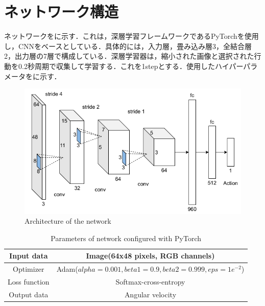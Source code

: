 
\section{ネットワーク構造}

  ネットワークをに示す．これは，深層学習フレームワークであるPyTorch\cite{pytorch}を使用し，CNNをベースとしている．具体的には，入力層，畳み込み層3，全結合層2，出力層の7層で構成している．深層学習器は，縮小された画像と選択された行動を0.2秒周期で収集して学習する．これを1stepとする．使用したハイパーパラメータをに示す．

  \begin{figure}[h]
    \centering
    \includegraphics[keepaspectratio, scale=0.60] {images/RobotGuidance_network.png}
    \caption{Architecture of the network}
    \label{Fig:RobotGuidance_network}
  \end{figure}

  \begin{table}[hbtp]
    \caption{Parameters of network configured with PyTorch}
    \label{tab:Parameters of network configured with pytorch}
    \centering
    \begin{tabular}{|c|c|}
      \hline
      Input data & Image(64x48 pixels, RGB channels) \\
      \hline
      Optimizer & Adam($alpha = 0.001, beta1 = 0.9, beta2 =  0.999, eps = 1e^{-2}$)\\
      \hline
      Loss function & Softmax-cross-entropy\\
      \hline
      Output data & Angular velocity\\
      \hline
    \end{tabular}
  \end{table}

\newpage
